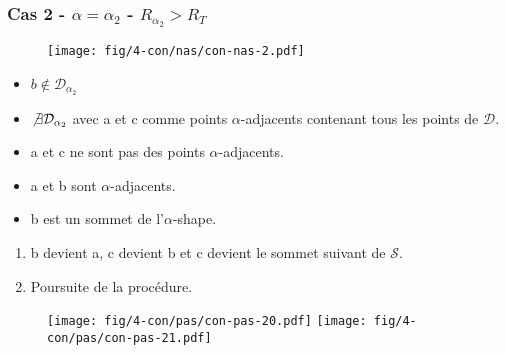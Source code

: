 \begin{frame}
\frametitle{Cas 2 - $\alpha = \alpha_{2}$ - $R_{\alpha_{2}} > R_T$}
{
  \begin{figure}[H]
    \centering
    \texttt{[image: fig/4-con/nas/con-nas-2.pdf]}
  \end{figure}
}

\begin{block}{}
  \begin{itemize}
    \item $b \not\in \mathcal{D}_{\alpha_2}$
    \item $\not\exists \mathcal{D}_{\alpha_2}$ avec a et c comme points $\alpha$-adjacents contenant tous les points de $\mathcal{D}$.
    \item a et c ne sont pas des points $\alpha$-adjacents.
    \item a et b sont $\alpha$-adjacents.
    \item \alert{b est un sommet de l'$\alpha$-shape.}
  \end{itemize}
\end{block}

{
  \begin{block}{}
    \begin{enumerate}
      \item b devient a, c devient b et c devient le sommet suivant de $\mathcal{S}$.\\
      \item Poursuite de la procédure.
    \end{enumerate}
  \end{block}
 
  \begin{figure}[H]
    \centering
    \texttt{[image: fig/4-con/pas/con-pas-20.pdf]}
    \texttt{[image: fig/4-con/pas/con-pas-21.pdf]}
  \end{figure}
}
\end{frame}

